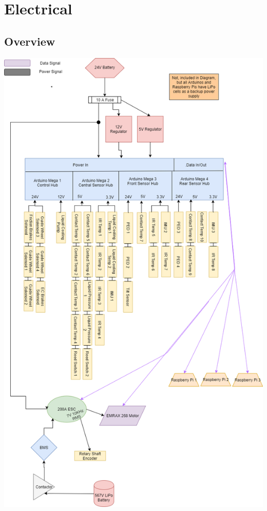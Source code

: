 \documentclass[main.tex]{subfiles}
\begin{document}
    \chapter{Electrical}
    \label{ch:electrical}

	\section{Overview}
    \includegraphics[width=\linewidth]{images/EE_Block__1_.png}
\end{document}
